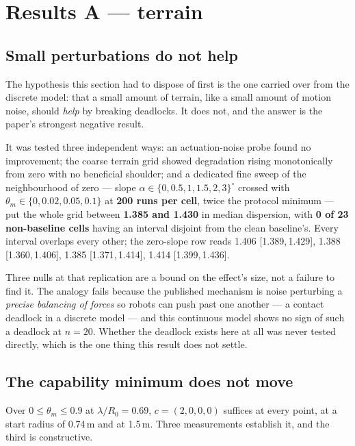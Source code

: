 \documentclass[11pt,a4paper]{article}
\newcommand{\CI}[2]{[#1,\,#2]}
\begin{document}
\section{Results A --- terrain}
\label{sec:results-a}

\subsection{Small perturbations do not help}

The hypothesis this section had to dispose of first is the one carried over from
the discrete model: that a small amount of terrain, like a small amount of motion
noise, should \emph{help} by breaking deadlocks. It does not, and the answer is
the paper's strongest negative result.

It was tested three independent ways: an actuation-noise probe found no
improvement; the coarse terrain grid showed degradation rising monotonically from
zero with no beneficial shoulder; and a dedicated fine sweep of the neighbourhood
of zero --- slope $\alpha \in \{0, 0.5, 1, 1.5, 2, 3\}^{\circ}$ crossed with
$\theta_m \in \{0, 0.02, 0.05, 0.1\}$ at \textbf{200 runs per cell}, twice the
protocol minimum --- put the whole grid between \textbf{1.385 and 1.430} in median
dispersion, with \textbf{0 of 23 non-baseline cells} having an interval disjoint
from the clean baseline's. Every interval overlaps every other; the zero-slope row
reads 1.406 \CI{1.389}{1.429}, 1.388 \CI{1.360}{1.406}, 1.385 \CI{1.371}{1.414},
1.414 \CI{1.399}{1.436}.

Three nulls at that replication are a bound on the effect's size, not a failure to
find it. The analogy fails because the published mechanism is noise perturbing a
\emph{precise balancing of forces} so robots can push past one another --- a
contact deadlock in a discrete model --- and this continuous model shows no sign
of such a deadlock at $n = 20$. Whether the deadlock exists here at all was never
tested directly, which is the one thing this result does not settle.

\subsection{The capability minimum does not move}

Over $0 \le \theta_m \le 0.9$ at $\lambda/R_0 = 0.69$, $c = (2,0,0,0)$ suffices
at every point, at a start radius of 0.74\,m and at 1.5\,m. Three measurements
establish it, and the third is constructive.
\end{document}
